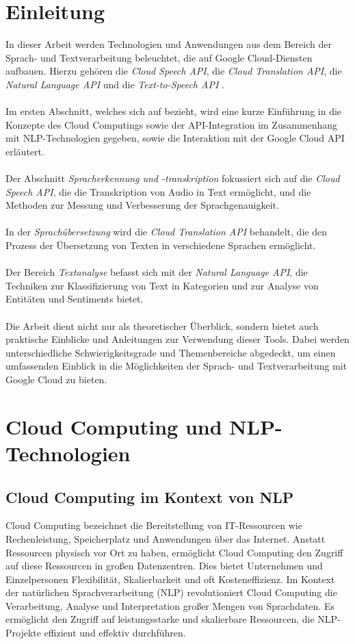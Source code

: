 \documentclass[12pt,a4paper]{article}
\begin{document}
\section*{Einleitung}
In dieser Arbeit werden Technologien und Anwendungen aus dem Bereich der Sprach- und Textverarbeitung beleuchtet, die auf Google Cloud-Diensten aufbauen. Hierzu gehören die \textit{Cloud Speech API}, die \textit{Cloud Translation API}, die \textit{Natural Language API} und die \textit{Text-to-Speech API} \cite{googlecloudskills2023}.
\\ \\
Im ersten Abschnitt, welches sich auf \cite{giefers2023cloud} bezieht, wird eine kurze Einführung in die Konzepte des Cloud Computings sowie der API-Integration im Zusammenhang mit NLP-Technologien gegeben, sowie die Interaktion mit der Google Cloud API erläutert.
\\ \\
Der Abschnitt \textit{Spracherkennung und -transkription} fokussiert sich auf die \textit{Cloud Speech API}, die die Transkription von Audio in Text ermöglicht, und die Methoden zur Messung und Verbesserung der Sprachgenauigkeit.
\\ \\
In der \textit{Sprachübersetzung} wird die \textit{Cloud Translation API} behandelt, die den Prozess der Übersetzung von Texten in verschiedene Sprachen ermöglicht.
\\ \\
Der Bereich \textit{Textanalyse} befasst sich mit der \textit{Natural Language API}, die Techniken zur Klassifizierung von Text in Kategorien und zur Analyse von Entitäten und Sentiments bietet.
\\ \\
Die Arbeit dient nicht nur als theoretischer Überblick, sondern bietet auch praktische Einblicke und Anleitungen zur Verwendung dieser Tools. Dabei werden unterschiedliche Schwierigkeitsgrade und Themenbereiche abgedeckt, um einen umfassenden Einblick in die Möglichkeiten der Sprach- und Textverarbeitung mit Google Cloud zu bieten.

	
\newpage

\section{Cloud Computing und NLP-Technologien}

\subsection{Cloud Computing im Kontext von NLP}
Cloud Computing bezeichnet die Bereitstellung von IT-Ressourcen wie Rechenleistung, Speicherplatz und Anwendungen über das Internet. Anstatt Ressourcen physisch vor Ort zu haben, ermöglicht Cloud Computing den Zugriff auf diese Ressourcen in großen Datenzentren. Dies bietet Unternehmen und Einzelpersonen Flexibilität, Skalierbarkeit und oft Kosteneffizienz. Im Kontext der natürlichen Sprachverarbeitung (NLP) revolutioniert Cloud Computing die Verarbeitung, Analyse und Interpretation großer Mengen von Sprachdaten. Es ermöglicht den Zugriff auf leistungsstarke und skalierbare Ressourcen, die NLP-Projekte effizient und effektiv durchführen.
\end{document}
